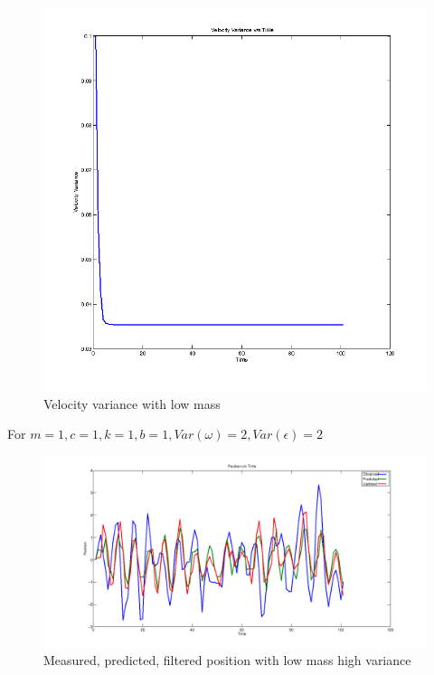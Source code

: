\documentclass[12pt]{article}
\begin{document}
\begin{figure}
    \includegraphics[width=\linewidth]{kalman-variance2-m1}
    \caption{Velocity variance with low mass}
\end{figure}


For $m=1,c=1,k=1,b=1, Var(\omega)=2, Var(\epsilon)=2$


\begin{figure}
    \includegraphics[width=\linewidth]{kalman-position-m1h}
    \caption{Measured, predicted, filtered position with low mass high variance}
\end{figure}
\end{document}
